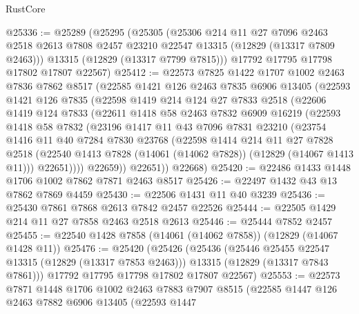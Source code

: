 \begin{lexlean}{RustCore}
\begin{coremodule}
@25336 := @25289
    (@25295
      (@25305
        (@25306
          @214
          @11
          @27
          @7096
          @2463
          @2518
          @2613
          @7808
          @2457
          @23210
          @22547
          @13315
          (@12829 (@13317 @7809 @2463)))
        @13315
        (@12829 (@13317 @7799 @7815)))
      @17792
      @17795
      @17798
      @17802
      @17807
      @22567)
@25412 := @22573
    @7825
    @1422
    @1707
    @1002
    @2463
    @7836
    @7862
    @8517
    (@22585
      @1421
      @126
      @2463
      @7835
      @6906
      @13405
      (@22593
        @1421
        @126
        @7835
        (@22598
          @1419
          @214
          @124
          @27
          @7833
          @2518
          (@22606
            @1419
            @124
            @7833
            (@22611
              @1418
              @58
              @2463
              @7832
              @6909
              @16219
              (@22593
                @1418
                @58
                @7832
                (@23196
                  @1417
                  @11
                  @43
                  @7096
                  @7831
                  @23210
                  (@23754
                    @1416
                    @11
                    @40
                    @7284
                    @7830
                    @23768
                    (@22598
                      @1414
                      @214
                      @11
                      @27
                      @7828
                      @2518
                      (@22540 @1413 @7828 (@14061 (@14062 @7828)) (@12829 (@14067 @1413 @11)))
                      @22651))))
              @22659))
          @22651))
      @22668)
@25420 := @22486 @1433 @1448 @1706 @1002 @7862 @7871 @2463 @8517
@25426 := @22497 @1432 @43 @13 @7862 @7869 @4459
@25430 := @22506 @1431 @11 @40 @3239
@25436 := @25430 @7861 @7868 @2613 @7842 @2457 @22526
@25444 := @22505 @1429 @214 @11 @27 @7858 @2463 @2518 @2613
@25446 := @25444 @7852 @2457
@25455 := @22540 @1428 @7858 (@14061 (@14062 @7858)) (@12829 (@14067 @1428 @11))
@25476 := @25420
    (@25426
      (@25436
        (@25446 @25455 @22547 @13315 (@12829 (@13317 @7853 @2463)))
        @13315
        (@12829 (@13317 @7843 @7861)))
      @17792
      @17795
      @17798
      @17802
      @17807
      @22567)
@25553 := @22573
    @7871
    @1448
    @1706
    @1002
    @2463
    @7883
    @7907
    @8515
    (@22585
      @1447
      @126
      @2463
      @7882
      @6906
      @13405
      (@22593
        @1447

\end{coremodule}
\end{lexlean}
